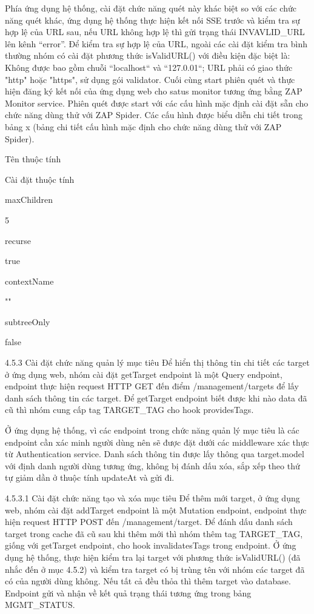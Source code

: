 Phía ứng dụng hệ thống, cài đặt chức năng quét này khác biệt so với các chức năng quét khác, ứng dụng hệ thống thực hiện kết nối SSE trước và kiểm tra sự hợp lệ của URL sau, nếu URL không hợp lệ thì gửi trạng thái INVAVLID\_URL lên kênh “error”. Để kiểm tra sự hợp lệ của URL, ngoài các cài đặt kiểm tra bình thường nhóm có cài đặt phương thức isValidURL() với điều kiện đặc biệt là: Không được bao gồm chuỗi “localhost“ và “127.0.01“; URL phải có giao thức "http" hoặc "https", sử dụng gói validator. Cuối cùng start phiên quét và thực hiện đăng ký kết nối của ứng dụng web cho satus monitor tương ứng bằng ZAP Monitor service. Phiên quét được start với các cấu hình mặc định cài đặt sẵn cho chức năng dùng thử với ZAP Spider. Các cấu hình được biểu diễn chi tiết trong bảng x (bảng chi tiết cấu hình mặc định cho chức năng dùng thử với ZAP Spider).

Tên thuộc tính

Cài đặt thuộc tính

maxChildren

5

recurse

true

contextName

""

subtreeOnly

false

4.5.3 Cài đặt chức năng quản lý mục tiêu
Để hiển thị thông tin chi tiết các target ở ứng dụng web, nhóm cài đặt getTarget endpoint là một Query endpoint, endpoint thực hiện request HTTP GET đến điểm /management/targets để lấy danh sách thông tin các target. Để getTarget endpoint biết được khi nào data đã cũ thì nhóm cung cấp tag TARGET\_TAG cho hook providesTags.

Ở ứng dụng hệ thống, vì các endpoint trong chức năng quản lý mục tiêu là các endpoint cần xác minh người dùng nên sẽ được đặt dưới các middleware xác thực từ Authentication service. Danh sách thông tin được lấy thông qua target.model với định danh người dùng tương ứng, không bị đánh dấu xóa, sắp xếp theo thứ tự giảm dần ở thuộc tính updateAt và gửi đi.

4.5.3.1 Cài đặt chức năng tạo và xóa mục tiêu
Để thêm mới target, ở ứng dụng web, nhóm cài đặt addTarget endpoint là một Mutation endpoint, endpoint thực hiện request HTTP POST đến /management/target. Để đánh dấu danh sách target trong cache đã cũ sau khi thêm mới thì nhóm thêm tag TARGET\_TAG, giống với getTarget endpoint, cho hook invalidatesTags trong endpoint. Ở ứng dụng hệ thống, thực hiện kiểm tra lại target với phương thức isValidURL() (đã nhắc đến ở mục 4.5.2) và kiểm tra target có bị trùng tên với nhóm các target đã có của người dùng không. Nếu tất cả đều thỏa thì thêm target vào database. Endpoint gửi và nhận về kết quả trạng thái tương ứng trong bảng MGMT\_STATUS.

